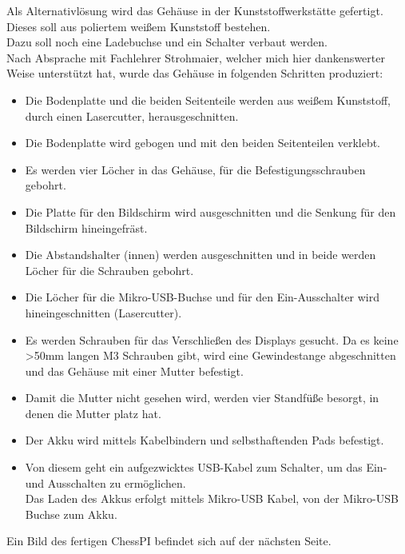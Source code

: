 \documentclass[12pt,a4paper]{article}
\begin{document}
Als Alternativlösung wird das Gehäuse in der Kunststoffwerkstätte gefertigt. Dieses soll aus poliertem weißem Kunststoff bestehen. \\
Dazu soll noch eine Ladebuchse und ein Schalter verbaut werden. \\
Nach Absprache mit Fachlehrer Strohmaier, welcher mich hier dankenswerter Weise unterstützt hat, wurde das Gehäuse in folgenden Schritten produziert:
\begin{itemize}
	\item{Die Bodenplatte und die beiden Seitenteile werden aus weißem Kunststoff, durch einen Lasercutter, herausgeschnitten.}
	\item{Die Bodenplatte wird gebogen und mit den beiden Seitenteilen verklebt.}
	\item{Es werden vier Löcher in das Gehäuse, für die Befestigungsschrauben gebohrt.}
	\item{Die Platte für den Bildschirm wird ausgeschnitten und die Senkung für den Bildschirm hineingefräst.}
	\item{Die Abstandshalter (innen) werden ausgeschnitten und in beide werden Löcher für die Schrauben gebohrt.}
	\item{Die Löcher für die Mikro-USB-Buchse und für den Ein-Ausschalter wird hineingeschnitten (Lasercutter).}
	\item{Es werden Schrauben für das Verschließen des Displays gesucht. Da es keine >50mm langen M3 Schrauben gibt, wird eine Gewindestange abgeschnitten und das Gehäuse mit einer Mutter befestigt.}
	\item{Damit die Mutter nicht gesehen wird, werden vier Standfüße besorgt, in denen die Mutter platz hat.}
	\item{Der Akku wird mittels Kabelbindern und selbsthaftenden Pads befestigt.}
	\item{Von diesem geht ein aufgezwicktes USB-Kabel zum Schalter, um das Ein- und Ausschalten zu ermöglichen. \\
Das Laden des Akkus erfolgt mittels Mikro-USB Kabel, von der Mikro-USB Buchse zum Akku.}
\end{itemize}
 
Ein Bild des fertigen ChessPI befindet sich auf der nächsten Seite.

\newpage
\end{document}
